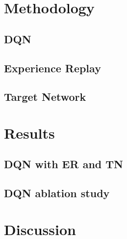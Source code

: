 \documentclass{article}
\begin{document}
\section{Methodology}
\label{sec_Methodology}

\subsection{DQN}

\subsection{Experience Replay}

\subsection{Target Network}



\section{Results}
\label{sec_results}

\subsection{DQN with ER and TN}


\subsection{DQN ablation study}

\section{Discussion}


\end{document}
